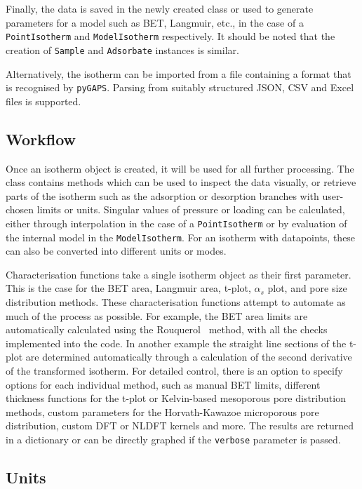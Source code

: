 Finally, the data is saved in the newly created class or used to generate parameters
for a model such as BET, Langmuir, etc.,
in the case of a \texttt{PointIsotherm} and
\texttt{ModelIsotherm} respectively. It should be noted that the creation of
\texttt{Sample} and \texttt{Adsorbate} instances is similar.

Alternatively, the isotherm can be imported from a file containing a format that
is recognised by \texttt{pyGAPS}. Parsing from suitably structured JSON, CSV and Excel
files is supported.

\subsection{Workflow}

Once an isotherm object is created, it will be used for all further processing.
The class contains methods which can be used to inspect the data visually, or retrieve
parts of the isotherm such as the adsorption or desorption branches with
user-chosen limits or units. Singular values of pressure or loading can be calculated,
either through interpolation in the case of a \texttt{PointIsotherm} or by evaluation
of the internal model in the \texttt{ModelIsotherm}. For an isotherm with
datapoints, these can also be converted into different units or modes.

Characterisation functions take a single isotherm object as their first parameter. This is the
case for the BET area, Langmuir area, t-plot, \(\alpha_s\) plot, and pore size
distribution methods. These characterisation functions attempt to automate as much
of the process as possible. For example, the BET area limits are automatically
calculated using the Rouquerol~\cite{rouquerolAdsorptionPowdersPorous2013} method, with
all the checks implemented into the code. In another example
the straight line sections of the t-plot are determined automatically through a calculation of
the second derivative of the transformed isotherm.
For detailed control, there is an option to specify
options for each individual method, such as manual BET limits, different thickness
functions for the t-plot or Kelvin-based mesoporous pore distribution methods,
custom parameters for the Horvath-Kawazoe microporous pore distribution, custom
DFT or NLDFT kernels and more. The results are returned in a dictionary or can be
directly graphed if the \texttt{verbose} parameter is passed.


\subsection{Units}

